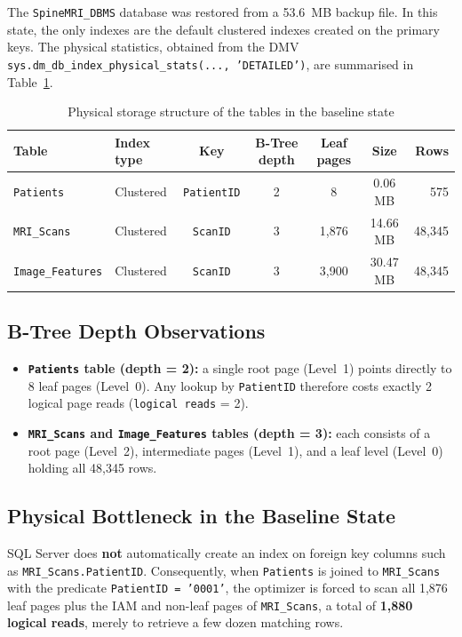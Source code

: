 The \texttt{SpineMRI\_DBMS} database was restored from a 53.6~MB backup file. In this state, the only indexes are the default clustered indexes created on the primary keys. The physical statistics, obtained from the DMV \texttt{sys.dm\_db\_index\_physical\_stats(..., 'DETAILED')}, are summarised in Table~\ref{tab:baseline-storage}.

\begin{table}[H]
\centering
\caption{Physical storage structure of the tables in the baseline state}
\label{tab:baseline-storage}
\small
\begin{tabular}{llccccr}
\toprule
\textbf{Table} & \textbf{Index type} & \textbf{Key} & \textbf{B-Tree depth} & \textbf{Leaf pages} & \textbf{Size} & \textbf{Rows} \\
\midrule
\texttt{Patients}        & Clustered & \texttt{PatientID} & 2 & 8     & 0.06 MB  & 575    \\
\texttt{MRI\_Scans}      & Clustered & \texttt{ScanID}    & 3 & 1,876 & 14.66 MB & 48,345 \\
\texttt{Image\_Features} & Clustered & \texttt{ScanID}    & 3 & 3,900 & 30.47 MB & 48,345 \\
\bottomrule
\end{tabular}
\end{table}

\subsection{B-Tree Depth Observations}

\begin{itemize}
  \item \textbf{\texttt{Patients} table (depth = 2):} a single root page (Level~1) points directly to 8 leaf pages (Level~0). Any lookup by \texttt{PatientID} therefore costs exactly 2 logical page reads (\texttt{logical reads} = 2).
  \item \textbf{\texttt{MRI\_Scans} and \texttt{Image\_Features} tables (depth = 3):} each consists of a root page (Level~2), intermediate pages (Level~1), and a leaf level (Level~0) holding all 48,345 rows.
\end{itemize}

\subsection{Physical Bottleneck in the Baseline State}

SQL Server does \textbf{not} automatically create an index on foreign key columns such as \texttt{MRI\_Scans.PatientID}. Consequently, when \texttt{Patients} is joined to \texttt{MRI\_Scans} with the predicate \texttt{PatientID = '0001'}, the optimizer is forced to scan all 1,876 leaf pages plus the IAM and non-leaf pages of \texttt{MRI\_Scans}, a total of \textbf{1,880 logical reads}, merely to retrieve a few dozen matching rows.

